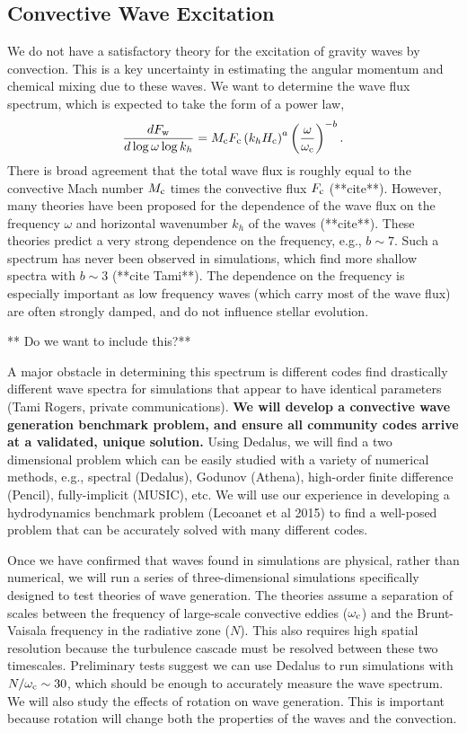 {\color{purple}
\subsection{Convective Wave Excitation}
}

We do not have a satisfactory theory for the excitation of gravity waves by convection. This is a key uncertainty in estimating the angular momentum and chemical mixing due to these waves. We want to determine the wave flux spectrum, which is expected to take the form of a power law,
\begin{equation}
\frac{d F_{\rm w}}{d\log \omega \log k_h} = M_{\rm c}F_{\rm c} \left(k_h H_{\rm c}\right)^{a} \left(\frac{\omega}{\omega_{\rm c}}\right)^{-b}.
\end{equation}
There is broad agreement that the total wave flux is roughly equal to the convective Mach number $M_{\rm c}$ times the convective flux $F_{\rm c}$ (**cite**). However, many theories have been proposed for the dependence of the wave flux on the frequency $\omega$ and horizontal wavenumber $k_h$ of the waves (**cite**). These theories predict a very strong dependence on the frequency, e.g., $b\sim 7$. Such a spectrum has never been observed in simulations, which find more shallow spectra with $b\sim 3$ (**cite Tami**). The dependence on the frequency is especially important as low frequency waves (which carry most of the wave flux) are often strongly damped, and do not influence stellar evolution. 

** Do we want to include this?**

A major obstacle in determining this spectrum is different codes find drastically different wave spectra for simulations that appear to have identical parameters (Tami Rogers, private communications). \textbf{We will develop a convective wave generation benchmark problem, and ensure all community codes arrive at a validated, unique solution.} Using Dedalus, we will find a two dimensional problem which can be easily studied with a variety of numerical methods, e.g., spectral (Dedalus), Godunov (Athena), high-order finite difference (Pencil), fully-implicit (MUSIC), etc. We will use our experience in developing a hydrodynamics benchmark problem (Lecoanet et al 2015) to find a well-posed problem that can be accurately solved with many different codes.

Once we have confirmed that waves found in simulations are physical, rather than numerical, we will run a series of three-dimensional simulations specifically designed to test theories of wave generation. The theories assume a separation of scales between the frequency of large-scale convective eddies ($\omega_{\rm c}$) and the Brunt-Vaisala frequency in the radiative zone ($N$). This also requires high spatial resolution because the turbulence cascade must be resolved between these two timescales. Preliminary tests suggest we can use Dedalus to run simulations with $N/\omega_{\rm c}\sim 30$, which should be enough to accurately measure the wave spectrum. We will also study the effects of rotation on wave generation. This is important because rotation will change both the properties of the waves and the convection.

